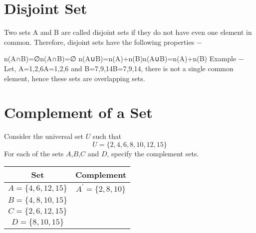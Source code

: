 \section{Disjoint Set}
Two sets A and B are called disjoint sets if they do not have even one element in common. Therefore, disjoint sets have the following properties −

n(A∩B)=∅n(A∩B)=∅
n(A∪B)=n(A)+n(B)n(A∪B)=n(A)+n(B)
Example − Let, A={1,2,6}A={1,2,6} and B={7,9,14}B={7,9,14}, there is not a single common element, hence these sets are overlapping sets.



\section*{Complement of a Set}
Consider the universal set $U$ such that
\[U=\{2,4,6,8,10,12,15\} \]
For each of the sets $A$,$B$,$C$ and $D$, specify the complement sets.
{
	\LARGE
\begin{center}
\begin{tabular}{|c|c|}
  \hline
Set &\phantom{sp} Complement \phantom{sp}\\
\hline \phantom{sp} $A=\{4,6,12,15\}$ \phantom{sp} &
$A^{\prime}=\{2,8,10\}$ \\ \hline $B=\{4,8,10,15\}$ & \\ \hline
$C=\{2,6,12,15\}$ & \\ \hline $D=\{8,10,15\}$ & \\ \hline

\end{tabular}
\end{center}
}
